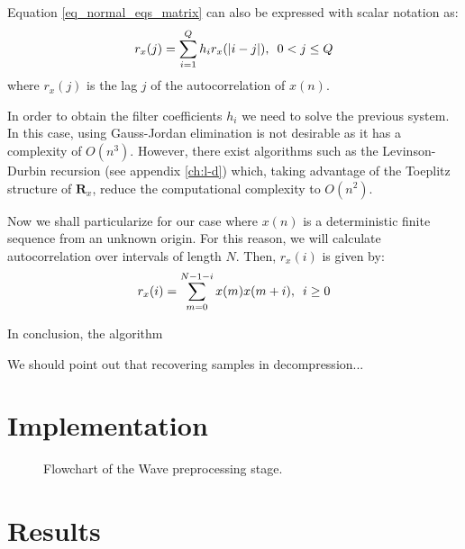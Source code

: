 Equation \ref{eq_normal_eqs_matrix} can also be expressed with scalar notation as:
\begin{equation} \label{eq:normal_equations}
r_x(j) = \sum_{i=1}^{Q} h_i r_x(|i-j|) ,\hspace{0.5em} 0 < j \leq Q
\end{equation}
where $r_x(j)$ is the lag $j$ of the autocorrelation of $x(n)$.

In order to obtain the filter coefficients $h_i$ we need to solve the previous system. In this case, using Gauss-Jordan elimination is not desirable as it has a complexity of $O(n^3)$. However, there exist algorithms such as the Levinson-Durbin recursion (see appendix \ref{ch:l-d}) which, taking advantage of the Toeplitz structure of $\mathbf{R}_x$, reduce the computational complexity to $O(n^2)$.

Now we shall particularize for our case where $x(n)$ is a deterministic finite sequence from an unknown origin. For this reason, we will calculate autocorrelation over intervals of length $N$. Then, $r_x(i)$ is given by:
\begin{equation}
r_x(i) = \sum_{m=0}^{N-1-i} x(m) x(m+i) ,\hspace{0.5em} i \geq 0
\end{equation}

In conclusion, the algorithm 

We should point out that recovering samples in decompression...

\section{Implementation}

\begin{figure}[h!]
	\begin{center}
		\scalebox{.7}{}
	\end{center}
	\caption{Flowchart of the Wave preprocessing stage.}
	\label{fig:wave_flowchart}
\end{figure}

\section{Results}

